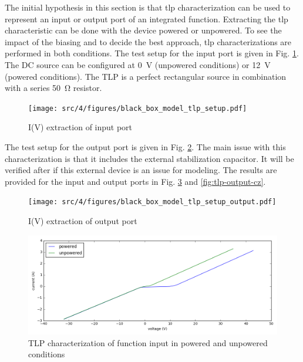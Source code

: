 The initial hypothesis in this section is that \gls{tlp} characterization can be used to represent an input or output port of an integrated function.
Extracting the \gls{tlp} characteristic can be done with the device powered or unpowered.
To see the impact of the biasing and to decide the best approach, \gls{tlp} characterizations are performed in both conditions.
The test setup for the input port is given in Fig. \ref{fig:tlp-input-testbench}.
The DC source can be configured at \SI{0}{\volt} (unpowered conditions) or \SI{12}{\volt} (powered conditions).
The TLP is a perfect rectangular source in combination with a series \SI{50}{\ohm} resistor.

\begin{figure}[!h]
  \centering
  \texttt{[image: src/4/figures/black\_box\_model\_tlp\_setup.pdf]}
  \caption{I(V) extraction of input port}
  \label{fig:tlp-input-testbench}
\end{figure}

The test setup for the output port is given in Fig. \ref{fig:tlp-output-testbench}.
The main issue with this characterization is that it includes the external stabilization capacitor.
It will be verified after if this external device is an issue for modeling.
The results are provided for the input and output ports in Fig. \ref{fig:tlp-input-cz} and \ref{fig:tlp-output-cz}.

\begin{figure}[!h]
  \centering
  \texttt{[image: src/4/figures/black\_box\_model\_tlp\_setup\_output.pdf]}
  \caption{I(V) extraction of output port}
  \label{fig:tlp-output-testbench}
\end{figure}

\begin{figure}[!h]
  \centering
  \includegraphics[width=\textwidth]{src/4/figures/tlp_input_characterization.png}
  \caption{TLP characterization of function input in powered and unpowered conditions}
  \label{fig:tlp-input-cz}
\end{figure}

